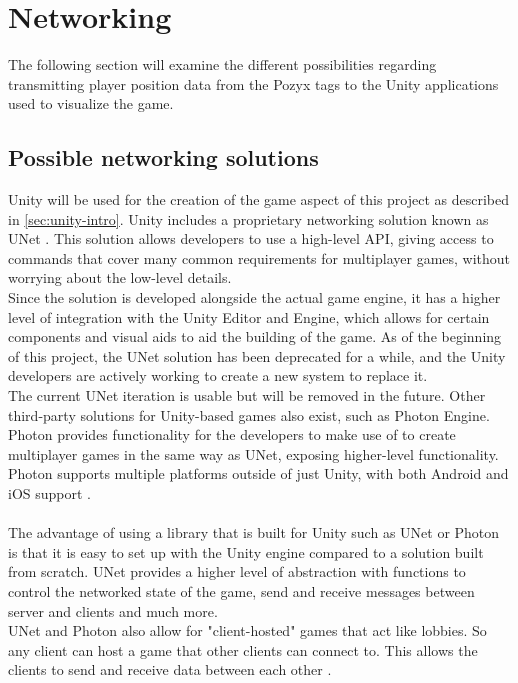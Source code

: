 \section{Networking}\label{sec:sprint1-networking}
The following section will examine the different possibilities regarding transmitting player position data from the Pozyx tags to the Unity applications used to visualize the game.

\subsection{Possible networking solutions}
Unity will be used for the creation of the game aspect of this project as described in \autoref{sec:unity-intro}.
Unity includes a proprietary networking solution known as UNet \cite{unityunet}.
This solution allows developers to use a high-level API, giving access to commands that cover many common requirements for multiplayer games, without worrying about the low-level details. \\
Since the solution is developed alongside the actual game engine, it has a higher level of integration with the Unity Editor and Engine, which allows for certain components and visual aids to aid the building of the game.
As of the beginning of this project, the UNet solution has been deprecated for a while, and the Unity developers are actively working to create a new system to replace it. \\
The current UNet iteration is usable but will be removed in the future.
Other third-party solutions for Unity-based games also exist, such as Photon Engine.
Photon provides functionality for the developers to make use of to create multiplayer games in the same way as UNet, exposing higher-level functionality.
Photon supports multiple platforms outside of just Unity, with both Android and iOS support \cite{photonnet}.
\\\\
The advantage of using a library that is built for Unity such as UNet or Photon is that it is easy to set up with the Unity engine compared to a solution built from scratch.
UNet provides a higher level of abstraction with functions to control the networked state of the game, send and receive messages between server and clients and much more.\\
UNet and Photon also allow for "client-hosted" games that act like lobbies.
So any client can host a game that other clients can connect to.
This allows the clients to send and receive data between each other \cite{unityunet}. 
